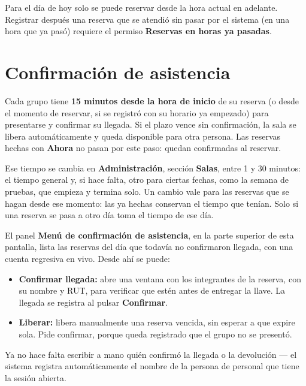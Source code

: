 \documentclass[11pt,a4paper]{report}
\begin{document}
\begin{nota}
Para el día de hoy solo se puede reservar desde la hora actual en
adelante. Registrar después una reserva que se atendió sin pasar por el
sistema (en una hora que ya pasó) requiere el permiso
\textbf{Reservas en horas ya pasadas}.
\end{nota}

\section{Confirmación de asistencia}

Cada grupo tiene \textbf{15 minutos desde la hora de inicio} de su reserva
(o desde el momento de reservar, si se registró con su horario ya empezado)
para presentarse y confirmar su llegada. Si el plazo vence sin
confirmación, la sala se libera automáticamente y queda disponible para
otra persona. Las reservas hechas con \textbf{Ahora} no pasan por este paso:
quedan confirmadas al reservar.

Ese tiempo se cambia en \textbf{Administración}, sección \textbf{Salas},
entre 1 y 30 minutos: el tiempo general y, si hace falta, otro para
ciertas fechas, como la semana de pruebas, que empieza y termina solo. Un cambio
vale para las reservas que se hagan desde ese momento: las ya hechas conservan el
tiempo que tenían. Solo si una reserva se pasa a otro día toma el tiempo de ese día.

El panel \textbf{Menú de confirmación de asistencia}, en la parte
superior de esta pantalla, lista las reservas del día que todavía no
confirmaron llegada, con una cuenta regresiva en vivo. Desde ahí se puede:

\begin{itemize}
  \item \textbf{Confirmar llegada:} abre una ventana con los integrantes
  de la reserva, con su nombre y RUT, para verificar que estén antes de
  entregar la llave. La llegada se registra al pulsar \textbf{Confirmar}.
  \item \textbf{Liberar:} libera manualmente una reserva vencida, sin
  esperar a que expire sola. Pide confirmar, porque queda registrado que
  el grupo no se presentó.
\end{itemize}


\begin{nota}
Ya no hace falta escribir a mano quién confirmó la llegada o la
devolución --- el sistema registra automáticamente el nombre de la
persona de personal que tiene la sesión abierta.
\end{nota}
\end{document}
